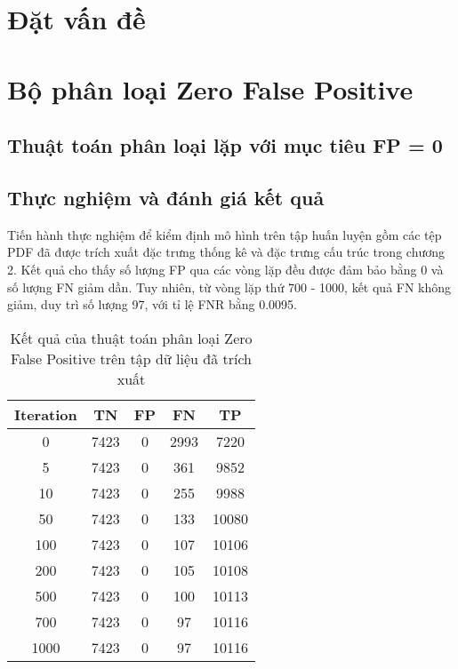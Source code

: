 \documentclass[./../main.tex]{subfiles}
\begin{document}
\section{Đặt vấn đề}
\section{Bộ phân loại Zero False Positive}
\subsection{Thuật toán phân loại lặp với mục tiêu FP = 0}
\subsection{Thực nghiệm và đánh giá kết quả}
Tiến hành thực nghiệm để kiểm định mô hình trên tập huấn luyện gồm các tệp PDF đã được trích xuất đặc trưng thống kê và đặc trưng cấu trúc trong chương 2. Kết quả cho thấy số lượng FP qua các vòng lặp đều được đảm bảo bằng 0 và số lượng FN giảm dần. Tuy nhiên, từ vòng lặp thứ 700 - 1000, kết quả FN không giảm, duy trì số lượng 97, với tỉ lệ FNR bằng 0.0095.

\begin{table}[]
	\centering
	\caption{Kết quả của thuật toán phân loại Zero False Positive trên tập dữ liệu đã trích xuất}
	\label{tab:ket_qua_thuat_toan_phan_loai}
	\begin{tabular}{|c|c|c|c|c|}
		\hline
		\textbf{Iteration} & \textbf{TN} & \textbf{FP} & \textbf{FN} & \textbf{TP} \\ \hline
		0                  & 7423        & 0           & 2993        & 7220        \\ \hline
		5                  & 7423        & 0           & 361         & 9852        \\ \hline
		10                 & 7423        & 0           & 255         & 9988        \\ \hline
		50                 & 7423        & 0           & 133         & 10080       \\ \hline
		100                & 7423        & 0           & 107         & 10106       \\ \hline
		200                & 7423        & 0           & 105         & 10108       \\ \hline
		500                & 7423        & 0           & 100         & 10113       \\ \hline
		700                & 7423        & 0           & 97          & 10116       \\ \hline
		1000               & 7423        & 0           & 97          & 10116       \\ \hline
	\end{tabular}
\end{table}
\end{document}
